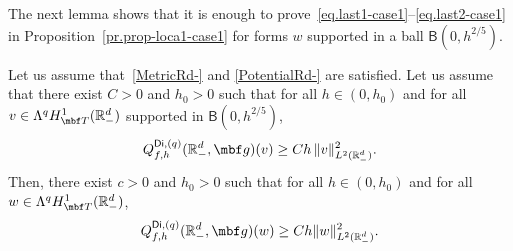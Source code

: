The next lemma shows that it is enough to
prove~\eqref{eq.last1-case1}--\eqref{eq.last2-case1} in
Proposition~\ref{pr.prop-loca1-case1} for forms $w$ supported in a
ball $\mathsf B(0,h^{2/5})$.
\begin{lemma}\label{le.IMS-loca}
Let us assume that~\ref{MetricRd-} and \ref{PotentialRd-} are
satisfied. Let us assume that there exist $C>0$ and $h_0>0$ such
that for all $h\in (0,h_0)$ and for all $v\in \Lambda^q H^1_{\mbf T}(\mathbb R^d_-)$ supported in $\mathsf B(0,h^{2/5})$,
\begin{equation}\label{eq.cond1Q}
Q_{f,h}^{\mathsf{Di},(q)}(\mathbb R^d_-,\mbf g)(v)\ge Ch\, \Vert v \Vert_{L^2(\mathbb R^d_-)}^2.
\end{equation}
Then, there exist $c>0$ and $h_0>0$ such that for all $h\in
(0,h_0)$ and for all $w\in \Lambda^q H^1_{\mbf T}(\mathbb R^d_-)$,
\begin{align*}
Q_{f,h}^{\mathsf{Di},(q)}(\mathbb R^d_-,\mbf g)(w)\ge Ch \Vert w \Vert_{L^2(\mathbb R_-^d)}^2.
\end{align*}
\end{lemma}

